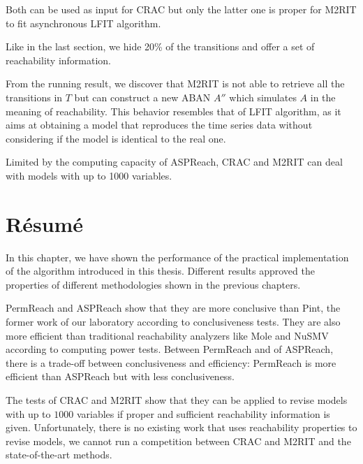 Both can be used as input for CRAC but only the latter one is proper for M2RIT to fit asynchronous LFIT algorithm.

Like in the last section, we hide 20\% of the transitions and offer a set of reachability information.

From the running result, we discover that M2RIT is not able to retrieve all the transitions in $T$ but can construct a new ABAN $A''$ which simulates $A$ in the meaning of reachability.
This behavior resembles that of LFIT algorithm, as it aims at obtaining a model that reproduces the time series data without considering if the model is identical to the real one. 

Limited by the computing capacity of ASPReach, CRAC and M2RIT can deal with models with up to 1000 variables.

\section{R\'esum\'e}

In this chapter, we have shown the performance of the practical implementation of the algorithm introduced in this thesis.
Different results approved the properties of different methodologies shown in the previous chapters.

PermReach and ASPReach show that they are more conclusive than Pint, the former work of our laboratory according to conclusiveness tests.
They are also more efficient than traditional reachability analyzers like Mole and NuSMV according to computing power tests.
Between PermReach and of ASPReach, there is a trade-off between conclusiveness and efficiency: 
PermReach is more efficient than ASPReach but with less conclusiveness.

The tests of CRAC and M2RIT show that they can be applied to revise models with up to $1000$ variables if proper and sufficient reachability information is given.
Unfortunately, there is no existing work that uses reachability properties to revise models, we cannot run a competition between CRAC and M2RIT and the state-of-the-art methods.
